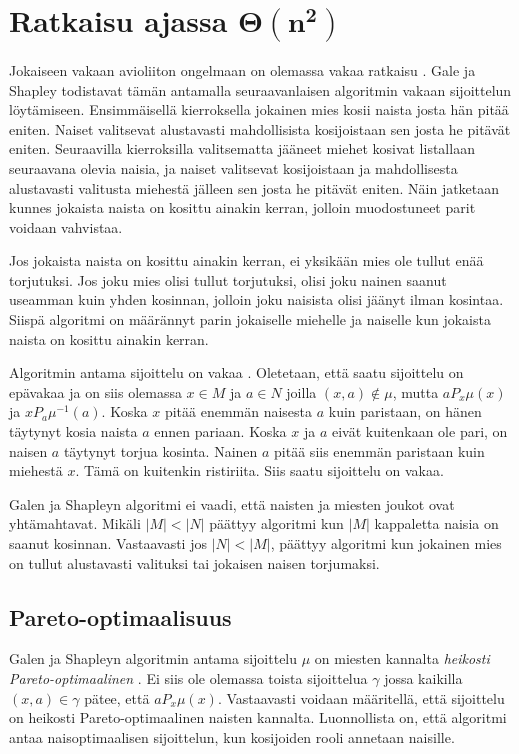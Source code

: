 \documentclass[gradu, twoside]{tktltiki}
\begin{document}
\section{Ratkaisu ajassa $\boldsymbol{\Theta(n^2)}$}

Jokaiseen vakaan avioliiton ongelmaan on olemassa vakaa ratkaisu
\cite{galeshapley62}. Gale ja Shapley todistavat tämän antamalla
seuraavanlaisen algoritmin vakaan sijoittelun löytämiseen.
Ensimmäisellä kierroksella jokainen mies kosii naista josta hän pitää
eniten. Naiset valitsevat alustavasti mahdollisista kosijoistaan sen
josta he pitävät eniten. Seuraavilla kierroksilla valitsematta jääneet
miehet kosivat listallaan seuraavana olevia naisia, ja naiset
valitsevat kosijoistaan ja mahdollisesta alustavasti valitusta
miehestä jälleen sen josta he pitävät eniten. Näin jatketaan kunnes
jokaista naista on kosittu ainakin kerran, jolloin muodostuneet parit
voidaan vahvistaa.

Jos jokaista naista on kosittu ainakin kerran, ei yksikään mies ole
tullut enää torjutuksi. Jos joku mies olisi tullut torjutuksi, olisi
joku nainen saanut useamman kuin yhden kosinnan, jolloin joku naisista
olisi jäänyt ilman kosintaa. Siispä algoritmi on määrännyt parin
jokaiselle miehelle ja naiselle kun jokaista naista on kosittu ainakin
kerran.

Algoritmin antama sijoittelu on vakaa \cite{galeshapley62}. Oletetaan,
että saatu sijoittelu on epävakaa ja on siis olemassa $x \in M$ ja $a
\in N$ joilla $(x, a) \notin \mu$, mutta $aP_x\mu(x)$ ja
$xP_a\mu^{-1}(a)$. Koska $x$ pitää enemmän naisesta $a$ kuin
paristaan, on hänen täytynyt kosia naista $a$ ennen pariaan. Koska $x$
ja $a$ eivät kuitenkaan ole pari, on naisen $a$ täytynyt torjua
kosinta. Nainen $a$ pitää siis enemmän paristaan kuin miehestä $x$.
Tämä on kuitenkin ristiriita. Siis saatu sijoittelu on vakaa.

Galen ja Shapleyn algoritmi ei vaadi, että naisten ja miesten joukot
ovat yhtämahtavat. Mikäli $|M| < |N|$ päättyy algoritmi kun $|M|$
kappaletta naisia on saanut kosinnan. Vastaavasti jos $|N| < |M|$,
päättyy algoritmi kun jokainen mies on tullut alustavasti valituksi
tai jokaisen naisen torjumaksi. \cite{galeshapley62}

\subsection{Pareto-optimaalisuus}

Galen ja Shapleyn algoritmin antama sijoittelu $\mu$ on miesten
kannalta \emph{heikosti Pareto-optimaalinen} \cite{gusfield89}. Ei
siis ole olemassa toista sijoittelua $\gamma$ jossa kaikilla $(x, a)
\in \gamma$ pätee, että $aP_x\mu(x)$. Vastaavasti voidaan määritellä,
että sijoittelu on heikosti Pareto-optimaalinen naisten kannalta.
Luonnollista on, että algoritmi antaa naisoptimaalisen sijoittelun,
kun kosijoiden rooli annetaan naisille.
\end{document}
